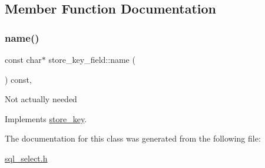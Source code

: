 \subsection{Member Function Documentation}
\mbox{\label{classstore__key__field_acc151e2c25c0fe5c09d2a28c4595413b}} 
\subsubsection{\texorpdfstring{name()}{name()}}
{\footnotesize\ttfamily const char$\ast$ store\+\_\+key\+\_\+field\+::name (\begin{DoxyParamCaption}{ }\end{DoxyParamCaption}) const\hspace{0.3cm}{\ttfamily [inline]}, {\ttfamily [virtual]}}

Not actually needed 

Implements \mbox{\hyperlink{classstore__key_a1c78dad4f3335d03b297cf30592914bf}{store\+\_\+key}}.



The documentation for this class was generated from the following file\+:\begin{DoxyCompactItemize}
\item 
\mbox{\hyperlink{sql__select_8h}{sql\+\_\+select.\+h}}\end{DoxyCompactItemize}
